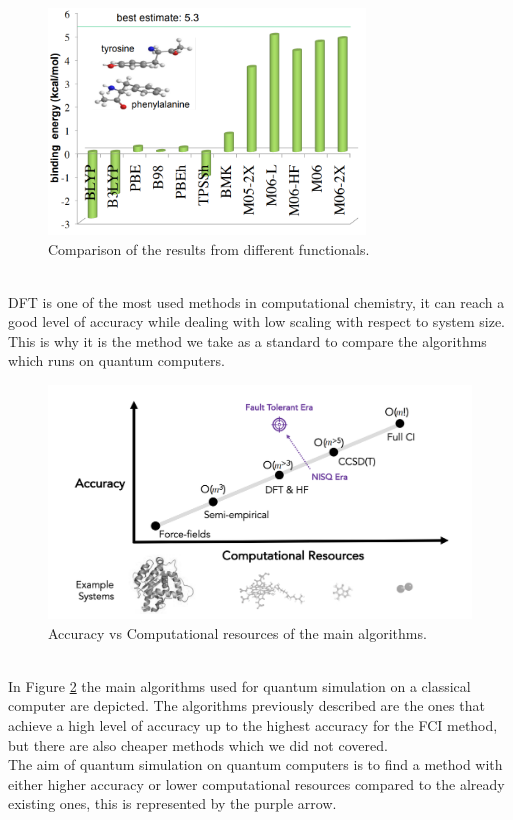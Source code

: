 \begin{figure}[ht]
  \centering
  \includegraphics[width=0.75\textwidth]{figures/Comparison DFT.png}
  \caption{Comparison of the results from different functionals.} \label{Comparison DFT}
\end{figure} \\
DFT is one of the most used methods in computational chemistry, it can reach a good level of accuracy while dealing with low scaling with respect to system size. This is why it is the method we take as a standard to compare the algorithms which runs on quantum computers. \\
\begin{figure}[ht]
  \centering
  \includegraphics[width=\textwidth]{figures/Limitations of classical quantum simulations - Copia.png}
  \caption{Accuracy vs Computational resources of the main algorithms.} \label{Accuracy vs Computational resources}
\end{figure}
\\
In Figure \ref{Accuracy vs Computational resources} the main algorithms used for quantum simulation on a classical computer are depicted. The algorithms previously described are the ones that achieve a high level of accuracy up to the highest accuracy for the FCI method, but there are also cheaper methods which we did not covered. \\
The aim of quantum simulation on quantum computers is to find a method with either higher accuracy or lower computational resources compared to the already existing ones, this is represented by the purple arrow.